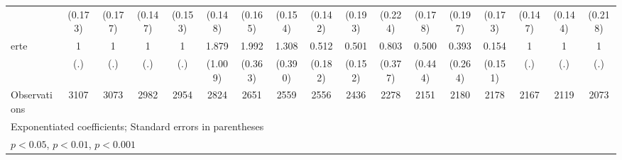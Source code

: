 {\begin{tabular}{l*{16}{c}}
                    &     (0.173)         &     (0.177)         &     (0.147)         &     (0.153)         &     (0.148)         &     (0.165)         &     (0.154)         &     (0.142)         &     (0.193)         &     (0.224)         &     (0.178)         &     (0.197)         &     (0.173)         &     (0.147)         &     (0.144)         &     (0.218)         \\
[1em]
erte                &           1         &           1         &           1         &           1         &       1.879         &       1.992\sym{***}&       1.308         &       0.512         &       0.501\sym{*}  &       0.803         &       0.500         &       0.393         &       0.154         &           1         &           1         &           1         \\
                    &         (.)         &         (.)         &         (.)         &         (.)         &     (1.009)         &     (0.363)         &     (0.390)         &     (0.182)         &     (0.152)         &     (0.377)         &     (0.444)         &     (0.264)         &     (0.151)         &         (.)         &         (.)         &         (.)         \\
\hline
Observations        &        3107         &        3073         &        2982         &        2954         &        2824         &        2651         &        2559         &        2556         &        2436         &        2278         &        2151         &        2180         &        2178         &        2167         &        2119         &        2073         \\
\hline\hline
\multicolumn{17}{l}{\footnotesize Exponentiated coefficients; Standard errors in parentheses}\\
\multicolumn{17}{l}{\footnotesize \sym{*} \(p<0.05\), \sym{**} \(p<0.01\), \sym{***} \(p<0.001\)}\\
\end{tabular}
}
